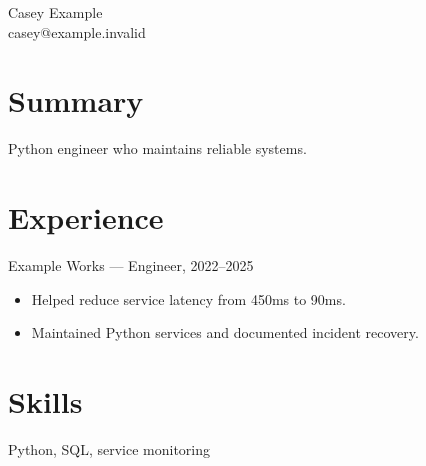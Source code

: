 \documentclass{article}
\begin{document}
Casey Example\\
casey@example.invalid

\section*{Summary}
Python engineer who maintains reliable systems.

\section*{Experience}
Example Works --- Engineer, 2022--2025
\begin{itemize}
\item Helped reduce service latency from 450ms to 90ms.
\item Maintained Python services and documented incident recovery.
\end{itemize}

\section*{Skills}
Python, SQL, service monitoring
\end{document}
